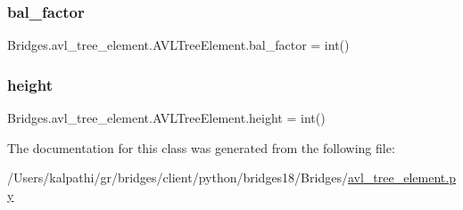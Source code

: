\subsubsection{\texorpdfstring{bal\+\_\+factor}{bal\_factor}}
{\footnotesize\ttfamily Bridges.\+avl\+\_\+tree\+\_\+element.\+A\+V\+L\+Tree\+Element.\+bal\+\_\+factor = int()\hspace{0.3cm}{\ttfamily [static]}}

\mbox{\label{class_bridges_1_1avl__tree__element_1_1_a_v_l_tree_element_ad4e11b61cca78051aea548c7fcb4e4fb}} 
\subsubsection{\texorpdfstring{height}{height}}
{\footnotesize\ttfamily Bridges.\+avl\+\_\+tree\+\_\+element.\+A\+V\+L\+Tree\+Element.\+height = int()\hspace{0.3cm}{\ttfamily [static]}}



The documentation for this class was generated from the following file\+:\begin{DoxyCompactItemize}
\item 
/\+Users/kalpathi/gr/bridges/client/python/bridges18/\+Bridges/\mbox{\hyperlink{avl__tree__element_8py}{avl\+\_\+tree\+\_\+element.\+py}}\end{DoxyCompactItemize}
